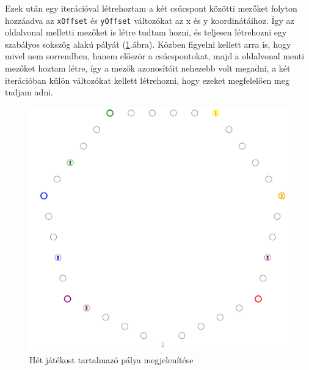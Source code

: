 \documentclass[a4paper,twoside]{article}
\begin{document}
Ezek után egy iterációval létrehoztam a két csúcspont közötti mezőket folyton hozzáadva az \verb|xOffset| és \verb|yOffset| változókat az x és y koordinátáihoz. Így az oldalvonal melletti mezőket is létre tudtam hozni, és teljesen létrehozni egy szabályos sokszög alakú pályát (\ref{hetesPalya}.ábra). Közben figyelni kellett arra is, hogy mivel nem sorrendben, hanem először a csúcspontokat, majd a oldalvonal menti mezőket hoztam létre, így a mezők azonosítóit nehezebb volt megadni, a két iterációban külön változókat kellett létrehozni, hogy ezeket megfelelően meg tudjam adni. 

\begin{figure}
	\caption{Hét játékost tartalmazó pálya megjelenítése}
	\label{hetesPalya}
	\centering
	\includegraphics[scale=0.5]{7espalya}
\end{figure}
\end{document}
